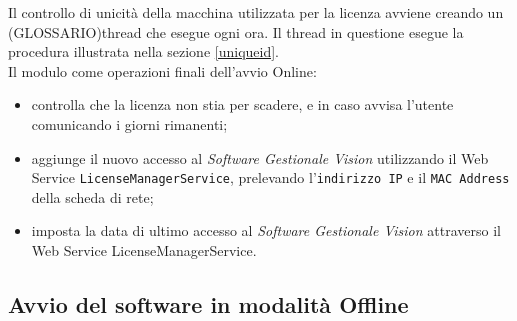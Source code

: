Il controllo di unicità della macchina utilizzata per la licenza avviene creando un (GLOSSARIO)thread che esegue ogni ora. Il thread in questione esegue la procedura illustrata nella sezione \ref{uniqueid}.\\

Il modulo come operazioni finali dell’avvio Online: 
\begin{itemize}

\item controlla che la licenza non stia per scadere, e in caso avvisa l’utente comunicando i giorni rimanenti;
\item aggiunge il nuovo accesso al \textit{Software Gestionale Vision} utilizzando il Web Service \texttt{LicenseManagerService}, prelevando l'\texttt{indirizzo IP} e il \texttt{MAC Address} della scheda di rete;
\item imposta la data di ultimo accesso al \textit{Software Gestionale Vision} attraverso il Web Service LicenseManagerService.

\end{itemize}

\subsection{Avvio del software in modalità Offline}
\label{off}

